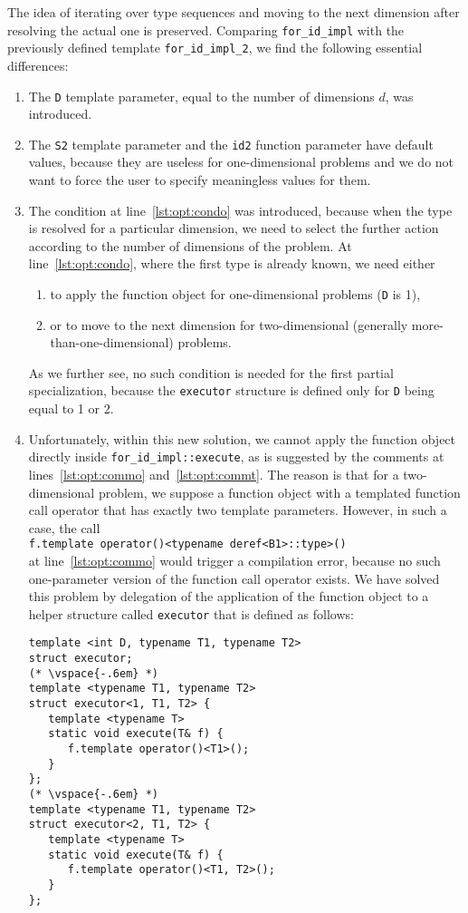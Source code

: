 \documentclass[10pt,a4paper]{article}
\theoremstyle{definition}\newtheorem{problem}{Problem}
\providecommand{\symdim}{\ensuremath{d}\xspace}
\begin{document}
\noindent
The idea of iterating over type sequences and moving to the next dimension after resolving the actual one is preserved. Comparing \verb|for_id_impl| with the previously defined template \verb|for_id_impl_2|, we find the following essential differences:
\begin{enumerate}
\item The \verb|D| template parameter, equal to the number of dimensions \symdim, was introduced.

\item The \verb|S2| template parameter and the \verb|id2| function parameter have default values, because they are useless for one-dimensional problems and we do not want to force the user to specify meaningless values for them.

\item The condition at line~\ref{lst:opt:condo} was introduced, because when the type is resolved for a particular dimension, we need to select the further action according to the number of dimensions of the problem. At line~\ref{lst:opt:condo}, where the first type is already known, we need either
\begin{enumerate}
\item to apply the function object for one-dimensional problems (\texttt{D} is 1),
\item or to move to the next dimension for two-dimensional (generally more-than-one-dimensional) problems.
\end{enumerate}
As we further see, no such condition is needed for the first partial specialization, because the \verb|executor| structure is defined only for \verb|D| being equal to 1 or 2.

\item Unfortunately, within this new solution, we cannot apply the function object directly inside \verb|for_id_impl::execute|, as is suggested by the comments at lines~\ref{lst:opt:commo} and~\ref{lst:opt:commt}. The reason is that for a two-dimensional problem, we suppose a function object with a templated function call operator that has exactly two template parameters. However, in such a case, the call \\ \verb|f.template operator()<typename deref<B1>::type>()| \\ at line~\ref{lst:opt:commo} would trigger a compilation error, because no such one-parameter version of the function call operator exists. We have solved this problem by delegation of the application of the function object to a helper structure called \texttt{executor} that is defined as follows:
{\small
\begin{lstlisting}
template <int D, typename T1, typename T2>
struct executor;
(* \vspace{-.6em} *)
template <typename T1, typename T2>
struct executor<1, T1, T2> {
   template <typename T>
   static void execute(T& f) {
      f.template operator()<T1>();
   }
};
(* \vspace{-.6em} *)
template <typename T1, typename T2>
struct executor<2, T1, T2> {
   template <typename T>
   static void execute(T& f) {
      f.template operator()<T1, T2>();
   }
};
\end{lstlisting}
}


\end{enumerate}
\end{document}
